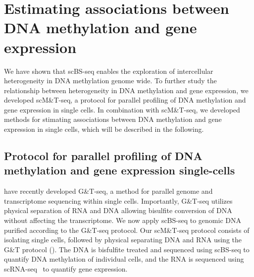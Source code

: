 \section{Estimating associations between DNA methylation and gene expression} \label{sec:mt}

\ifpdf
    \graphicspath{{Chapter3/mt/Figs/Raster/}{Chapter3/mt/Figs/PDF/}{Chapter3/mt/Figs/}}
\else
    \graphicspath{{Chapter3/mt/Figs/Vector/}{Chapter3/mt/Figs/}}
\fi

We have shown that scBS-seq enables the exploration of intercellular heterogeneity in DNA methylation genome wide. To further study the relationship between heterogeneity in DNA methylation and gene expression, we developed scM\&T-seq, a protocol for parallel profiling of DNA methylation and gene expression in single cells. In combination with scM\&T-seq, we developed methods for stimating associations between DNA methylation and gene expression in single cells, which will be described in the following.

\subsection{Protocol for parallel profiling of DNA methylation and gene expression single-cells}

\citet{macaulay_g&t-seq:_2015} have recently developed G\&T-seq, a method for parallel genome and transcriptome sequencing within single cells. Importantly, G\&T-seq utilizes physical separation of RNA and DNA allowing bisulfite conversion of DNA without affecting the transcriptome. We now apply scBS-seq to genomic DNA purified according to the G\&T-seq protocol. Our scM\&T-seq protocol consists of isolating single cells, followed by physical separating DNA and RNA using the G\&T protocol (). The DNA is bisfulfite treated and sequenced using scBS-seq to quantify DNA methylation of individual cells, and the RNA is sequenced using scRNA-seq~\citep{jaitin_massively_2014} to quantify gene expression.

